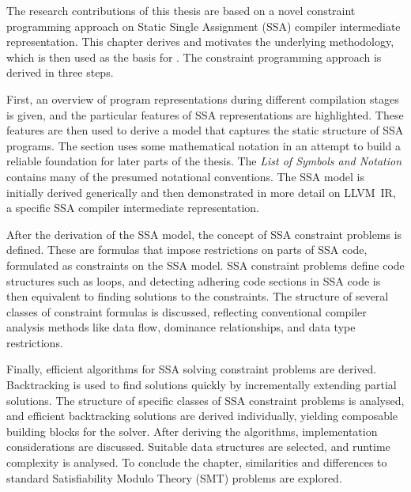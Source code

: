 
    The research contributions of this thesis are based on a novel constraint
    programming approach on Static Single Assignment (SSA) compiler intermediate
    representation.
    This chapter derives and motivates the underlying methodology, which is
    then used as the basis for
    .
    The constraint programming approach is derived in three steps.

    First, an overview of program representations during different compilation
    stages is given, and the particular features of SSA representations are
    highlighted.
    These features are then used to derive a model that captures the static
    structure of SSA programs.
    The section uses some mathematical notation in an attempt to build a
    reliable foundation for later parts of the thesis.
    The {\it List of Symbols and Notation} contains many of the presumed
    notational conventions.
    The SSA model is initially derived generically and then demonstrated in
    more detail on \mbox{LLVM IR}, a specific SSA compiler intermediate
    representation.

    After the derivation of the SSA model, the concept of SSA constraint
    problems is defined.
    These are formulas that impose restrictions on parts of SSA code,
    formulated as constraints on the SSA model.
    SSA constraint problems define code structures such as loops, and detecting
    adhering code sections in SSA code is then equivalent to finding
    solutions to the constraints.
    The structure of several classes of constraint formulas is discussed,
    reflecting conventional compiler analysis methods like data flow,
    dominance relationships, and data type restrictions.

    Finally, efficient algorithms for SSA solving constraint problems are
    derived.
    Backtracking is used to find solutions quickly by incrementally extending
    partial solutions.
    The structure of specific classes of SSA constraint problems is analysed,
    and efficient backtracking solutions are derived individually, yielding
    composable building blocks for the solver.
    After deriving the algorithms, implementation considerations are
    discussed.
    Suitable data structures are selected, and runtime complexity is analysed.
    To conclude the chapter, similarities and differences to standard
    Satisfiability Modulo Theory (SMT) problems are explored.


